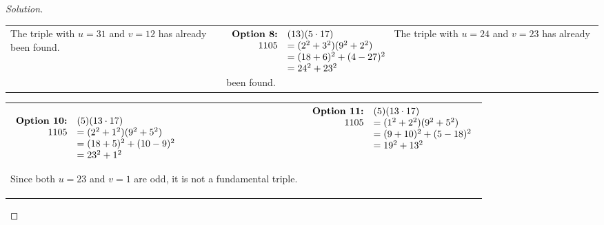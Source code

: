 \documentclass[11pt]{article}
\newenvironment{solution}
  {\renewcommand\qedsymbol{$~$}\begin{proof}[Solution]$ $\par\nobreak\ignorespaces}
  {\end{proof}}
\begin{document}
\begin{solution}
\begin{center}
\begin{NiceTabular}[width=0.95\textwidth]{X[l] !{\qquad} X[l]}
      The triple with $u=31$ and $v=12$ has already been found.

       &
      \begin{math}
        \begin{array}[t]{rl}
          \textbf{Option 8:} & (13)(5\cdot 17)       \\
          1105               & =  (2^2+3^2)(9^2+2^2) \\
                             & = (18+6)^2 + (4-27)^2 \\
                             & = 24^2 + 23^2         \\
        \end{array}
      \end{math}
      The triple with $u=24$ and $v=23$ has already been found.

      \\
    \end{NiceTabular}
  \end{center}

  \begin{center}
    \begin{NiceTabular}[width=0.95\textwidth]{X[l] !{\qquad} X[l]}
      \begin{math}
        \begin{array}[t]{rl}
          \textbf{Option 10:} & (5)(13\cdot 17)       \\
          1105                & =  (2^2+1^2)(9^2+5^2) \\
                              & = (18+5)^2 + (10-9)^2 \\
                              & = 23^2 + 1^2
        \end{array}
      \end{math}

      Since both $u=23$ and $v=1$ are odd, it is not a fundamental triple.

       &
      \begin{math}
        \begin{array}[t]{rl}
          \textbf{Option 11:} & (5)(13\cdot 17)       \\
          1105                & =  (1^2+2^2)(9^2+5^2) \\
                              & = (9+10)^2 + (5-18)^2 \\
                              & = 19^2 + 13^2         \\
        \end{array}
      \end{math}


\end{NiceTabular}
\end{center}
\end{solution}
\end{document}
